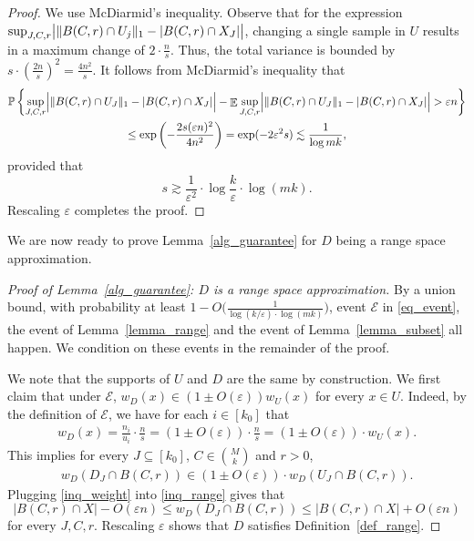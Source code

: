 \documentclass[11pt,letterpaper]{article}
\theoremstyle{definition}
\newcommand{\eps}{\varepsilon}
\DeclareMathOperator*{\E}{\ensuremath{\mathbb{E}}}
\DeclarePairedDelimiter{\abs}{\lvert}{\rvert}
\DeclarePairedDelimiter{\norm}{\lVert}{\rVert}
\begin{document}
\begin{proof}
We use McDiarmid's inequality. Observe that for the expression $\sup_{J,C,r} \abs[\big]{ \norm{B(C,r)\cap U_j}_1 - |B(C,r)\cap X_J| }$, changing a single sample in $U$ results in a maximum change of $2\cdot \frac{n}{s}$. Thus, the total variance is bounded by $s\cdot (\frac{2n}{s})^2=\frac{4n^2}{s}$. It follows from McDiarmid's inequality that
\begin{multline*}
\mathbb{P} \left\{ \sup_{J,C,r} \abs[\Big]{ \norm{B(C,r)\cap U_J}_1 - |B(C,r)\cap X_J| } - \E \sup_{J,C,r} \abs[\Big]{ \norm{B(C,r)\cap U_J}_1 - |B(C,r)\cap X_J| } > \eps n \right\}\\
\leq  \exp\left(-\frac{2s (\eps n)^2}{4n^2}\right) 
=   \exp(-2\eps^2 s) 
\lesssim \frac{1}{\log mk},
\end{multline*}
provided that 
\[
    s \gtrsim \frac{1}{\eps^2} \cdot \log \frac{k}{\eps}\cdot \log (mk).
\]
Rescaling $\eps$ completes the proof.
\end{proof}


We are now ready to prove Lemma~\ref{alg_guarantee} for $D$ being a range space approximation.

\begin{proof}[Proof of Lemma~\ref{alg_guarantee}: $D$ is a range space approximation]

By a union bound, with probability at least $1-O\big(\frac{1}{\log(k/\eps)\cdot \log (mk)}\big)$, event $\mathcal{E}$  in \eqref{eq_event}, the event of Lemma~\ref{lemma_range} and the event of Lemma~\ref{lemma_subset} all happen. We condition on these events in the remainder of the proof.


We note that the supports of $U$ and $D$ are the same by construction. We first claim that under $\mathcal{E}$, $w_D(x)\in (1\pm O(\eps))w_U(x)$ for every $x\in U$. Indeed, by the definition of $\mathcal{E}$, we have for each $i\in [k_0]$ that
\begin{eqnarray} \label{eq_weight}
w_D(x)=\frac{n_i}{u_i}\cdot \frac{n}{s}=(1\pm O(\eps))\cdot \frac{n}{s}=(1\pm O(\eps)) \cdot w_U(x).
\end{eqnarray}
This implies for every $J\subseteq [k_0]$, $C\in \binom{M}{k}$ and $r>0$,
\begin{eqnarray} \label{inq_weight}
w_D(D_J\cap B(C,r))\in (1\pm O(\eps)) \cdot w_D(U_J\cap B(C,r)).
\end{eqnarray}
Plugging \eqref{inq_weight} into \eqref{inq_range} gives that
\[
    |B(C,r)\cap X| - O(\eps n)\leq w_D(D_J\cap B(C,r)) \leq |B(C,r)\cap X| + O(\eps n)
\] 
for every $J,C,r$. Rescaling $\eps$ shows that $D$ satisfies Definition~\ref{def_range}.
\end{proof}
\end{document}
